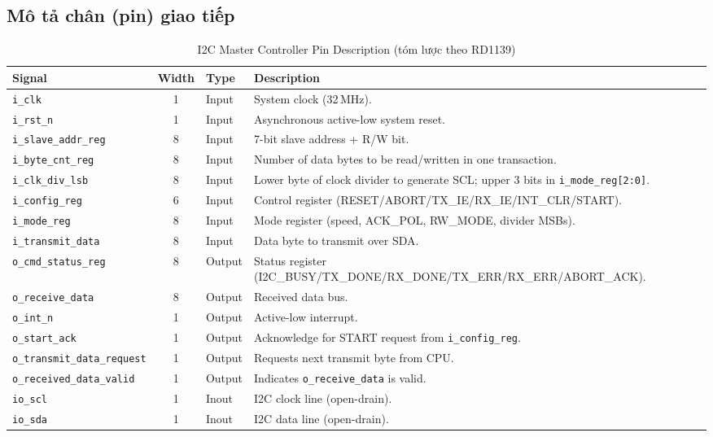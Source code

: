 \subsection{Mô tả chân (pin) giao tiếp}
\begin{table}[H]
    \centering
    \caption{I2C Master Controller Pin Description (tóm lược theo RD1139)}
    \label{tab:pin_desc}
    \begin{tabularx}{\textwidth}{|l|c|l|X|}
        \hline
        \textbf{Signal} & \textbf{Width} & \textbf{Type} & \textbf{Description} \\
        \hline
        \texttt{i\_clk} & 1 & Input & System clock (32\,MHz). \\
        \hline
        \texttt{i\_rst\_n} & 1 & Input & Asynchronous active-low system reset. \\
        \hline
        \texttt{i\_slave\_addr\_reg} & 8 & Input & 7-bit slave address + R/W bit. \\
        \hline
        \texttt{i\_byte\_cnt\_reg} & 8 & Input & Number of data bytes to be read/written in one transaction. \\
        \hline
        \texttt{i\_clk\_div\_lsb} & 8 & Input & Lower byte of clock divider to generate SCL; upper 3 bits in \texttt{i\_mode\_reg[2:0]}. \\
        \hline
        \texttt{i\_config\_reg} & 6 & Input & Control register (RESET/ABORT/TX\_IE/RX\_IE/INT\_CLR/START). \\
        \hline
        \texttt{i\_mode\_reg} & 8 & Input & Mode register (speed, ACK\_POL, RW\_MODE, divider MSBs). \\
        \hline
        \texttt{i\_transmit\_data} & 8 & Input & Data byte to transmit over SDA. \\
        \hline
        \texttt{o\_cmd\_status\_reg} & 8 & Output & Status register (I2C\_BUSY/TX\_DONE/RX\_DONE/TX\_ERR/RX\_ERR/ABORT\_ACK). \\
        \hline
        \texttt{o\_receive\_data} & 8 & Output & Received data bus. \\
        \hline
        \texttt{o\_int\_n} & 1 & Output & Active-low interrupt. \\
        \hline
        \texttt{o\_start\_ack} & 1 & Output & Acknowledge for START request from \texttt{i\_config\_reg}. \\
        \hline
        \texttt{o\_transmit\_data\_request} & 1 & Output & Requests next transmit byte from CPU. \\
        \hline
        \texttt{o\_received\_data\_valid} & 1 & Output & Indicates \texttt{o\_receive\_data} is valid. \\
        \hline
        \texttt{io\_scl} & 1 & Inout & I2C clock line (open-drain). \\
        \hline
        \texttt{io\_sda} & 1 & Inout & I2C data line (open-drain). \\
        \hline
    \end{tabularx}
\end{table}

